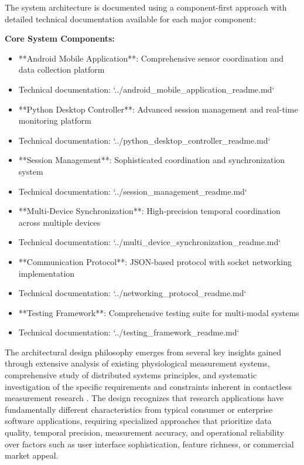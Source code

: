 \documentclass[11pt,a4paper]{article}
\begin{document}
The system architecture is documented using a component-first approach with detailed technical documentation available
for each major component:

\textbf{Core System Components:}

\begin{itemize}
\item **Android Mobile Application**: Comprehensive sensor coordination and data collection platform
\item Technical documentation: `../android_mobile_application_readme.md`
\item **Python Desktop Controller**: Advanced session management and real-time monitoring platform
\item Technical documentation: `../python_desktop_controller_readme.md`
\item **Session Management**: Sophisticated coordination and synchronization system
\item Technical documentation: `../session_management_readme.md`
\item **Multi-Device Synchronization**: High-precision temporal coordination across multiple devices
\item Technical documentation: `../multi_device_synchronization_readme.md`
\item **Communication Protocol**: JSON-based protocol with socket networking implementation
\item Technical documentation: `../networking_protocol_readme.md`
\item **Testing Framework**: Comprehensive testing suite for multi-modal systems
\item Technical documentation: `../testing_framework_readme.md`
\end{itemize}

The architectural design philosophy emerges from several key insights gained through extensive analysis of existing
physiological measurement systems, comprehensive study of distributed systems principles, and systematic investigation
of the specific requirements and constraints inherent in contactless measurement
research \cite{Lamport2001}. The design recognizes that
research applications have fundamentally different characteristics from typical consumer or enterprise software
applications, requiring specialized approaches that prioritize data quality, temporal precision, measurement accuracy,
and operational reliability over factors such as user interface sophistication, feature richness, or commercial market
appeal.
\end{document}
